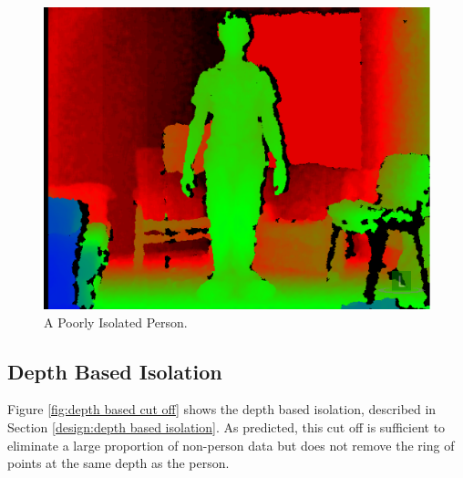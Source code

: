 \begin{figure}[h]
\begin{center}
\includegraphics[scale=0.4]{./testing/parse1} 
\end{center}
\caption{A Poorly Isolated Person.}
\label{fig:a poorly isolated person}
\end{figure} 

\subsection{Depth Based Isolation}
\label{testing:depth based isolation}
Figure \ref{fig:depth based cut off} shows the depth based isolation, described in Section \ref{design:depth based isolation}. As predicted, this cut off is sufficient to eliminate a large proportion of non-person data but does not remove the ring of points at the same depth as the person.\\

